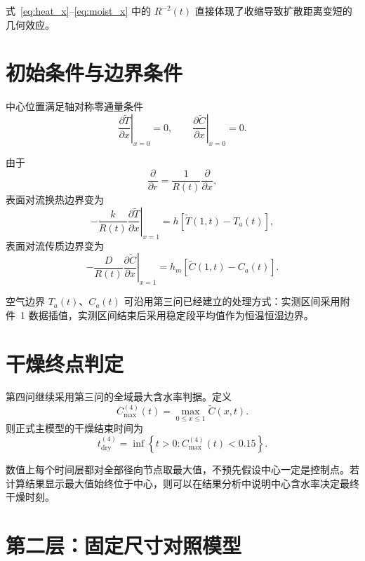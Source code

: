 \documentclass[UTF8,a4paper,12pt]{ctexart}
\begin{document}
式~\eqref{eq:heat_x}--\eqref{eq:moist_x} 中的 $R^{-2}(t)$ 直接体现了收缩导致扩散距离变短的几何效应。

\section{初始条件与边界条件}

中心位置满足轴对称零通量条件
\begin{equation}
\left.\frac{\partial\widetilde T}{\partial x}\right|_{x=0}=0,
\qquad
\left.\frac{\partial\widetilde C}{\partial x}\right|_{x=0}=0.
\label{eq:centerbc}
\end{equation}

由于
\[
\frac{\partial}{\partial r}
=
\frac{1}{R(t)}\frac{\partial}{\partial x},
\]
表面对流换热边界变为
\begin{equation}
-\frac{k}{R(t)}
\left.\frac{\partial\widetilde T}{\partial x}\right|_{x=1}
=
h\left[\widetilde T(1,t)-T_a(t)\right],
\label{eq:heatbc}
\end{equation}
表面对流传质边界变为
\begin{equation}
-\frac{D}{R(t)}
\left.\frac{\partial\widetilde C}{\partial x}\right|_{x=1}
=
h_m\left[\widetilde C(1,t)-C_a(t)\right].
\label{eq:moistbc}
\end{equation}

空气边界 $T_a(t)$、$C_a(t)$ 可沿用第三问已经建立的处理方式：实测区间采用附件~1 数据插值，实测区间结束后采用稳定段平均值作为恒温恒湿边界。

\section{干燥终点判定}

第四问继续采用第三问的全域最大含水率判据。定义
\begin{equation}
C_{\max}^{(4)}(t)
=
\max_{0\le x\le1}\widetilde C(x,t).
\label{eq:cmax4}
\end{equation}
则正式主模型的干燥结束时间为
\begin{equation}
\boxed{
t_{\mathrm{dry}}^{(4)}
=
\inf\left\{
t>0:
C_{\max}^{(4)}(t)<0.15
\right\}.
}
\label{eq:tdry4}
\end{equation}

数值上每个时间层都对全部径向节点取最大值，不预先假设中心一定是控制点。若计算结果显示最大值始终位于中心，则可以在结果分析中说明中心含水率决定最终干燥时刻。

\section{第二层：固定尺寸对照模型}
\end{document}
